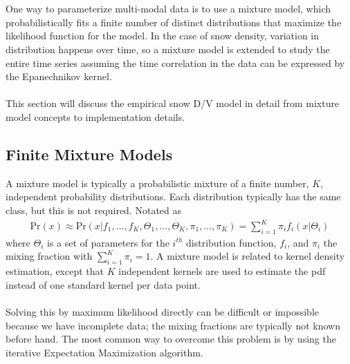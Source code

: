\documentclass[10pt,a4paper]{article}
\begin{document}
\\\\
One way to parameterize multi-modal data is to use a mixture model, which probabilistically fits a finite number of distinct distributions that maximize the likelihood function for the model. In the case of snow density, variation in distribution happens over time, so a mixture model is extended to study the entire time series assuming the time correlation in the data can be expressed by the Epanechnikov kernel.
\\\\
This section will discuss the empirical snow D/V model in detail from mixture model concepts to implementation details.

\subsection{Finite Mixture Models}
A mixture model is typically a probabilistic mixture of a finite number, $K$, independent probability distributions. Each distribution typically has the same class, but this is not required. Notated as 
\begin{align}
\text{Pr}(x) \approx \text{Pr}( x | f_1, \ldots, f_K, \Theta_1 , \ldots , \Theta_K , \pi_1 , \ldots , \pi_K  ) = \sum_{i=1}^{K}\pi_i  f_i(x | \Theta_i)
\end{align}
where $\Theta_i$ is a set of parameters for the $i^{th}$ distribution function, $f_i$, and $\pi_i$ the mixing fraction with $\sum_{i=1}^K \pi_i = 1$. A mixture model is related to kernel density estimation, except that $K$ independent kernels are used to estimate the pdf instead of one standard kernel per data point. 
\\\\
Solving this by maximum likelihood directly can be difficult or impossible because we have incomplete data; the mixing fractions are typically not known before hand. The most common way to overcome this problem is by using the iterative Expectation Maximization algorithm.
\end{document}

